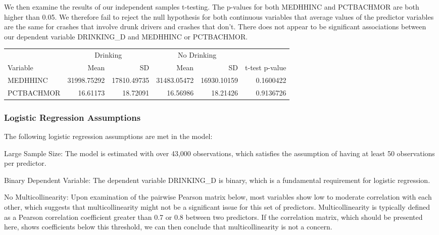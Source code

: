 \documentclass[
]{article}
\begin{document}
We then examine the results of our independent samples t-testing. The
p-values for both MEDHHINC and PCTBACHMOR are both higher than 0.05. We
therefore fail to reject the null hypothesis for both continuous
variables that average values of the predictor variables are the same
for crashes that involve drunk drivers and crashes that don't. There
does not appear to be significant associations between our dependent
variable DRINKING\_D and MEDHHINC or PCTBACHMOR.

\begin{table}
\centering
\begin{tabular}[t]{l|r|r|r|r|r}
\hline
\multicolumn{1}{c|}{ } & \multicolumn{2}{c|}{Drinking} & \multicolumn{2}{c|}{No Drinking} & \multicolumn{1}{c}{ } \\
\cline{2-3} \cline{4-5}
Variable & Mean & SD & Mean & SD & t-test p-value\\
\hline
MEDHHINC & 31998.75292 & 17810.49735 & 31483.05472 & 16930.10159 & 0.1600422\\
\hline
PCTBACHMOR & 16.61173 & 18.72091 & 16.56986 & 18.21426 & 0.9136726\\
\hline
\end{tabular}
\end{table}

\hypertarget{logistic-regression-assumptions}{%
\subsubsection{Logistic Regression
Assumptions}\label{logistic-regression-assumptions}}

The following logistic regression assumptions are met in the model:

Large Sample Size: The model is estimated with over 43,000 observations,
which satisfies the assumption of having at least 50 observations per
predictor.

Binary Dependent Variable: The dependent variable DRINKING\_D is binary,
which is a fundamental requirement for logistic regression.

No Multicollinearity: Upon examination of the pairwise Pearson matrix
below, most variables show low to moderate correlation with each other,
which suggests that multicollinearity might not be a significant issue
for this set of predictors. Multicollinearity is typically defined as a
Pearson correlation coefficient greater than 0.7 or 0.8 between two
predictors. If the correlation matrix, which should be presented here,
shows coefficients below this threshold, we can then conclude that
multicollinearity is not a concern.
\end{document}
